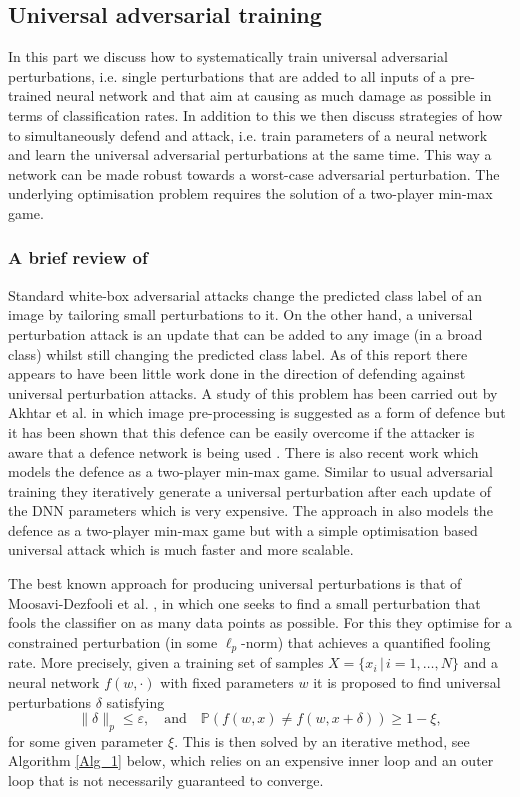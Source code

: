 \subsection{Universal adversarial training}\label{sec:uniadvtrain}
In this part we discuss how to systematically train universal adversarial perturbations, i.e. single perturbations that are added to all inputs of a pre-trained neural network and that aim at causing as much damage as possible in terms of classification rates. In addition to this we then discuss strategies of how to simultaneously defend and attack, i.e. train parameters of a neural network and learn the universal adversarial perturbations at the same time. This way a network can be made robust towards a worst-case adversarial perturbation. The underlying optimisation problem requires the solution of a two-player min-max game.

\subsubsection{A brief review of \cite{shafahi_universal_2018}}

Standard white-box adversarial attacks change the predicted class label of an image by tailoring small perturbations to it. On the other hand, a universal perturbation attack is an update that can be added to any image (in a broad class) whilst still changing the predicted class label. As of this report there appears to have been little work done in the direction of defending against universal perturbation attacks. A study of this problem has been carried out by Akhtar et al. \cite{akhtar_defense_2018} in which image pre-processing is suggested as a form of defence but it has been shown that this defence can be easily overcome if the attacker is aware that a defence network is being used \cite{carlini_adversarial_2017}. There is also recent work \cite{perolat_playing_2018} which models the defence as a two-player min-max game. Similar to usual adversarial training they iteratively generate a universal perturbation after each update of the DNN parameters which is very expensive. The approach in \cite{shafahi_universal_2018} also models the defence as a two-player min-max game but with a simple optimisation based universal attack which is much faster and more scalable.

The best known approach for producing universal perturbations is that of Moosavi-Dezfooli et al. \cite{moosavi-dezfooli_universal_2017}, in which one seeks to find a small perturbation that fools the classifier on as many data points as possible. For this they optimise for a constrained perturbation (in some $\ell_p$-norm) that achieves a quantified fooling rate.  More precisely, given a training set of samples $X=\{ x_i \, | \,  i=1,\ldots,N \}$ and a neural network $f(w,\cdot)$ with fixed parameters $w$ it is proposed to find universal perturbations $\delta$ satisfying 
$$\| \delta \|_p \leq \varepsilon, \quad \text{and} \quad \mathbb{P}(f(w, x) \neq f(w, x + \delta)) \geq 1-\xi,$$
for some given parameter $\xi$. This is then solved by an iterative method, see Algorithm \ref{Alg_1} below, which relies on an expensive inner loop and an outer loop that is not necessarily guaranteed to converge.  

